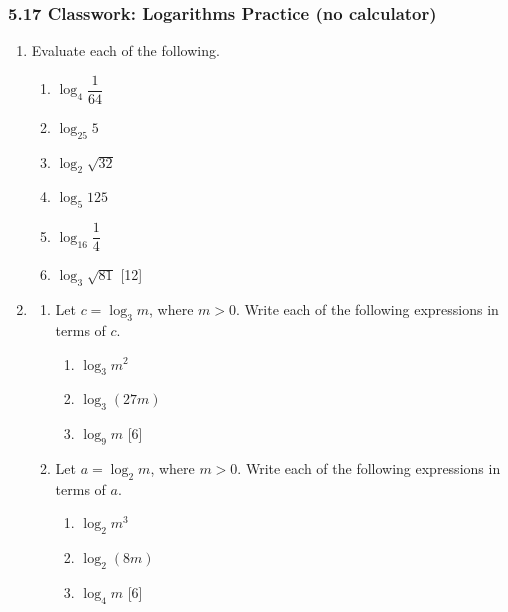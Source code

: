 \documentclass[12pt, twoside]{article}
\begin{document}
\subsubsection*{5.17 Classwork: Logarithms Practice (no calculator)}

\begin{enumerate}[itemsep=0.15cm]

\item[1.] [Maximum mark: 12]

Evaluate each of the following.

\begin{enumerate}[itemsep=0.1cm]
  \item $\log_4 \dfrac{1}{64}$
  \item $\log_{25} 5$
  \item $\log_2 \sqrt{32}$
  \item $\log_5 125$
  \item $\log_{16} \dfrac{1}{4}$
  \item $\log_3 \sqrt{81}$ \hfill [12]
\end{enumerate}


\newpage

\item[2.] [Maximum mark: 12]

\begin{enumerate}[itemsep=0.15cm]
  \item Let $c = \log_3 m$, where $m > 0$. Write each of the
  following expressions in terms of $c$.
  \begin{enumerate}[itemsep=0.1cm, label=(\roman*)]
    \item $\log_3 m^2$
    \item $\log_3(27m)$
    \item $\log_9 m$ \hfill [6]
  \end{enumerate}

  \item Let $a = \log_2 m$, where $m > 0$. Write each of the
  following expressions in terms of $a$.
  \begin{enumerate}[itemsep=0.1cm, label=(\roman*)]
    \item $\log_2 m^3$
    \item $\log_2(8m)$
    \item $\log_4 m$ \hfill [6]
  \end{enumerate}
\end{enumerate}


\end{enumerate}
\end{document}
